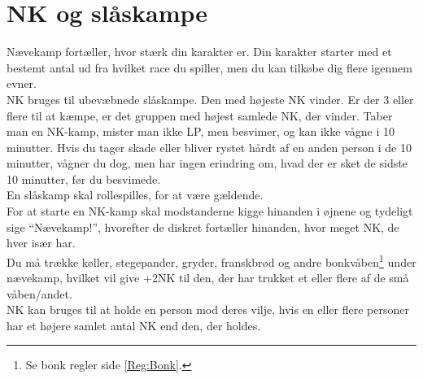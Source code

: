 \section{NK og slåskampe}
Nævekamp fortæller, hvor stærk din karakter er. Din karakter starter med et bestemt antal ud fra hvilket race du spiller, men du kan tilkøbe dig flere igennem evner.\\
NK bruges til ubevæbnede slåskampe. Den med højeste NK vinder. Er der 3 eller flere til at kæmpe, er det gruppen med højest samlede NK, der vinder. Taber man en NK-kamp, mister man ikke LP, men besvimer, og kan ikke vågne i 10 minutter. Hvis du tager skade eller bliver rystet hårdt af en anden person i de 10 minutter, vågner du dog, men har ingen erindring om, hvad der er sket de sidste 10 minutter, før du besvimede.\\
En slåskamp skal rollespilles, for at være gældende.\\
For at starte en NK-kamp skal modstanderne kigge hinanden i øjnene og tydeligt sige “Nævekamp!”, hvorefter de diskret fortæller hinanden, hvor meget NK, de hver især har.\\
Du må trække  køller, stegepander, gryder, franskbrød og andre bonkvåben\footnote{Se bonk regler side \ref{Reg:Bonk}.} under nævekamp, hvilket vil give +2NK til den, der har trukket et eller flere af de små våben/andet.\\
NK kan bruges til at holde en person mod deres vilje, hvis en eller flere personer har et højere samlet antal NK end den, der holdes.

